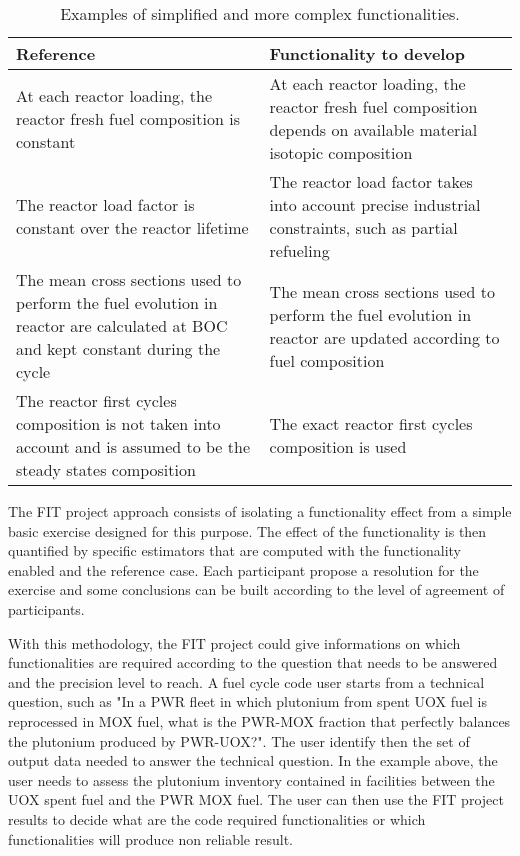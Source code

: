 \begin{table}[h]
\centering
\begin{tabular}{ |p{}|p{}| }
  \hline
  Reference & Functionality to develop \\
  \hline
  At each reactor loading, the reactor fresh fuel composition is constant & At
  each reactor loading, the reactor fresh fuel composition depends on available
  material isotopic composition \\
  \hline
  The reactor load factor is constant over the reactor lifetime & The reactor
  load factor takes into account precise industrial constraints, such as partial
  refueling \\
  \hline
  The mean cross sections used to perform the fuel evolution in reactor are
  calculated at BOC and kept constant during the cycle & The mean cross sections
  used to perform the fuel evolution in reactor are updated according to fuel
  composition \\
  \hline
  The reactor first cycles composition is not taken into account and is assumed
  to be the steady states composition & The exact reactor first cycles
  composition is used \\
  \hline
\end{tabular}
\label{Tab:Funct}
\caption{Examples of simplified and more complex functionalities.}
\end{table}

The FIT project approach consists of isolating a functionality effect from a
simple basic exercise designed for this purpose. The effect of the functionality
is then quantified by specific estimators that are computed with the
functionality enabled and the reference case. Each participant propose a
resolution for the exercise and some conclusions can be built according to the
level of agreement of participants.

With this methodology, the FIT project could give informations on which
functionalities are required according to the question that needs to be answered
and the precision level to reach. A fuel cycle code user starts from a technical
question, such as "In a PWR fleet in which plutonium from spent UOX fuel is
reprocessed in MOX fuel, what is the PWR-MOX fraction that perfectly balances
the plutonium produced by PWR-UOX?". The user identify then the set of output
data needed to answer the technical question. In the example above, the user
needs to assess the plutonium inventory contained in facilities between the UOX
spent fuel and the PWR MOX fuel. The user can then use the FIT project results
to decide what are the code required functionalities or which functionalities
will produce non reliable result. 

